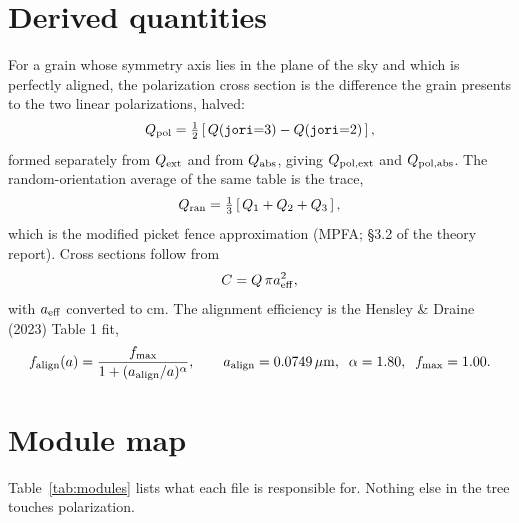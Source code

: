\documentclass{my_memo}
\newcommand{\code}[1]{\texttt{#1}}
\newcommand{\um}{\ensuremath{\,\mu\mathrm{m}}}
\newcommand{\falign}{\ensuremath{f_{\rm align}}}
\begin{document}
\section{Derived quantities}

For a grain whose symmetry axis lies in the plane of the sky and which is
perfectly aligned, the polarization cross section is the difference the grain
presents to the two linear polarizations, halved:
\begin{equation}
Q_{\rm pol} = \tfrac{1}{2}\left[\,Q(\code{jori}{=}3) - Q(\code{jori}{=}2)\,\right],
\label{eq:qpol}
\end{equation}
formed separately from $Q_{\rm ext}$ and from $Q_{\rm abs}$, giving
$Q_{\rm pol,ext}$ and $Q_{\rm pol,abs}$. The random-orientation average of the
same table is the trace,
\begin{equation}
Q_{\rm ran} = \tfrac{1}{3}\left[\,Q_1 + Q_2 + Q_3\,\right],
\label{eq:qran}
\end{equation}
which is the modified picket fence approximation (MPFA; \S3.2 of the theory
report). Cross sections follow from
\begin{equation}
C = Q\,\pi a_{\rm eff}^{2},
\end{equation}
with $a_{\rm eff}$ converted to cm. The alignment efficiency is the
Hensley \& Draine (2023) Table 1 fit,
\begin{equation}
\falign(a) = \frac{f_{\rm max}}{1 + (a_{\rm align}/a)^{\alpha}},
\qquad
a_{\rm align} = 0.0749\um,\;\;
\alpha = 1.80,\;\;
f_{\rm max} = 1.00 .
\label{eq:falign}
\end{equation}

\section{Module map}

Table~\ref{tab:modules} lists what each file is responsible for. Nothing else
in the tree touches polarization.
\end{document}

